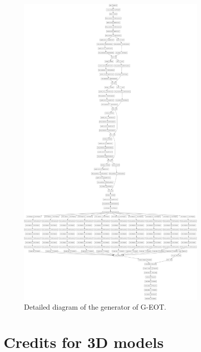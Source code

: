 \begin{figure}[h]
    \centering
    \includegraphics[width=0.8\textwidth]{graphics/detailed_generator.png}
    \caption{Detailed diagram of the generator of G-EOT.}
\end{figure}

\chapter{Credits for 3D models}
    \label{app:model_credits}

